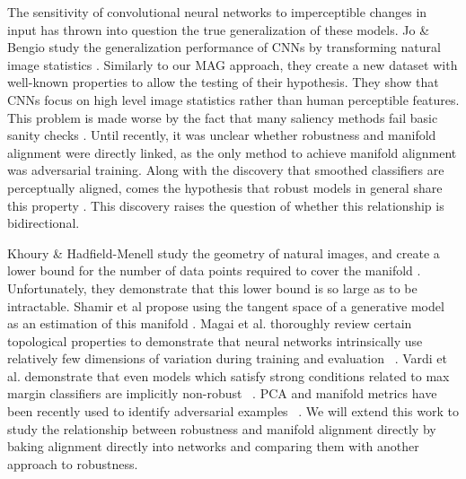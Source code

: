 The sensitivity of convolutional neural networks to imperceptible changes in input has thrown into question the true generalization of these models.
Jo \& Bengio study the generalization performance of CNNs by transforming natural image statistics \cite{jo2017measuring}.  %
Similarly to our MAG approach, they create a new dataset with well-known properties to allow the testing of their hypothesis.
They show that CNNs focus on high level image statistics rather than human perceptible features.
This problem is made worse by the fact that many saliency methods fail basic sanity checks \citep{adebayo2018sanity, kindermans2019reliability}.
Until recently, it was unclear whether robustness and manifold alignment were directly linked, as the only method to achieve manifold alignment was adversarial training.
Along with the discovery that smoothed classifiers are perceptually aligned, comes the hypothesis that robust models in general share this property \cite{kaur2019perceptually}.
This discovery raises the question of whether this relationship is bidirectional.

Khoury \& Hadfield-Menell study the geometry of natural images, and create a lower bound for the number of data points required to cover the manifold \citet{khoury2018geometry}.
Unfortunately, they demonstrate that this lower bound is so large as to be intractable.
Shamir et al propose using the tangent space of a generative model as an estimation of this manifold \cite{shamir2021dimpled}. Magai et al. thoroughly review certain topological properties to demonstrate that neural networks intrinsically use relatively few dimensions of variation during training and evaluation ~\cite{magai2022topology}. Vardi et al. demonstrate that even models which satisfy strong conditions related to max margin classifiers are implicitly non-robust ~\cite{vardi2022gradient}. PCA and manifold metrics have been recently used to identify adversarial examples ~\cite{aparne2022pca, nguyen-minh-luu-2022-textual}. We will extend this work to study the relationship between robustness and manifold alignment directly by baking alignment directly into networks and comparing them with another approach to robustness. 



